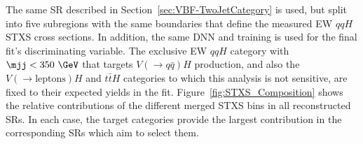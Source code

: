 The same SR described in Section~\ref{sec:VBF-TwoJetCategory} is used, but split into five subregions with the same boundaries that define the measured EW $qqH$ STXS cross sections. In addition, the same DNN and training is used for the final fit's discriminating variable.
The exclusive \TwoJet EW $qqH$ category with $\mjj < 350~\GeV$ that targets $V(\rightarrow q\bar{q})H$ production, and also the $V(\to \textrm{leptons})H$ and $t\bar{t}H$ categories to which this analysis is not sensitive, are fixed to their expected yields in the fit.
Figure~\ref{fig:STXS_Composition} shows the relative contributions of the different merged STXS bins in all reconstructed SRs.
In each case, the target categories provide the largest contribution in the corresponding SRs which aim to select them.


